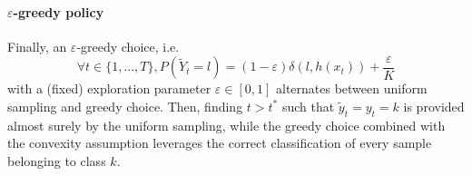 \documentclass[preprint,12pt,authoryear]{elsarticle}
\begin{document}
	\paragraph{$\varepsilon$-greedy policy} Finally, an $\varepsilon$-greedy choice, i.e. 
	$$\forall t \in \{1,...,T\}, P(\tilde{Y}_t=l) = (1-\varepsilon) \delta(l,h(x_t)) + \frac{\varepsilon}{K}$$ with a (fixed) exploration parameter $\varepsilon \in [0,1]$
	alternates between uniform sampling and greedy choice. Then, finding $t > t^*$ such that $\tilde{y}_t = y_t = k$ is provided almost surely by the uniform sampling, while the greedy choice combined with the convexity assumption leverages the correct classification of every sample belonging to class $k$.  

\end{document}
